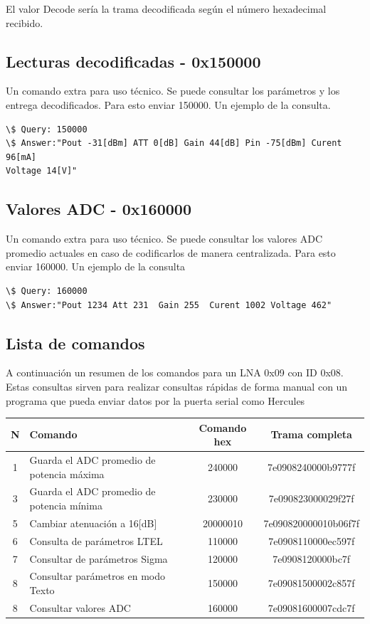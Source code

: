 \documentclass[12pt,twoside,onecolumn]{article}
\begin{document}
El valor Decode sería la trama decodificada según el número hexadecimal recibido.

\subsection{Lecturas decodificadas - 0x150000}\label{sec:str-param}
Un comando extra para uso técnico. Se puede consultar los parámetros y los entrega decodificados. Para esto enviar 150000. Un ejemplo de la consulta.

\begin{verbatim}
\$ Query: 150000
\$ Answer:"Pout -31[dBm] ATT 0[dB] Gain 44[dB] Pin -75[dBm] Curent 96[mA]
Voltage 14[V]"
\end{verbatim}

\subsection{Valores ADC - 0x160000}\label{sec:adc-param}
Un comando extra para uso técnico. Se puede consultar los valores ADC promedio actuales en caso de codificarlos de manera centralizada. Para esto enviar 160000. Un ejemplo de la consulta
\begin{verbatim}
\$ Query: 160000
\$ Answer:"Pout 1234 Att 231  Gain 255  Curent 1002 Voltage 462"
\end{verbatim}

\subsection{Lista de comandos}
A continuación un resumen de los comandos para un LNA 0x09 con ID 0x08. Estas consultas sirven para realizar consultas rápidas de forma manual con un programa que pueda enviar datos por la puerta serial como Hercules~\cite{web:hercules}
\begin{center}
\begin{tabular}{||c | l c c||} 
 \hline
 N & Comando & Comando hex & Trama completa \\ [0.5ex] 
 \hline\hline
 1 & Guarda el ADC promedio de potencia máxima & 240000 & 7e0908240000b9777f \\ 
 \hline
 3 & Guarda el ADC promedio de potencia mínima & 230000 & 7e090823000029f27f \\ 
 \hline
 5 & Cambiar atenuación a 16[dB]& 20000010 & 7e090820000010b06f7f \\
 \hline
  6 & Consulta de parámetros LTEL & 110000 & 7e0908110000ec597f \\
  \hline
  7 & Consultar de parámetros Sigma & 120000 &  7e0908120000bc7f \\
 \hline
 8 & Consultar parámetros en modo Texto & 150000 &  7e09081500002c857f \\
 \hline
  8 & Consultar valores ADC & 160000 &  7e09081600007cdc7f \\
 \hline
 
\end{tabular}
\end{center}
\end{document}
